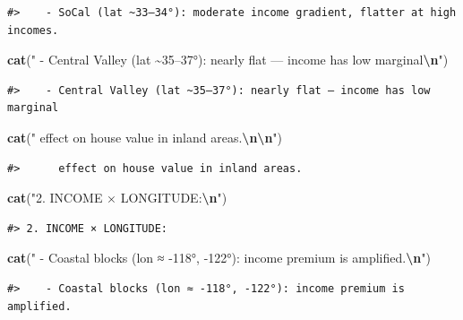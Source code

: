 \documentclass[
]{article}
\newenvironment{Shaded}{\begin{snugshade}}{\end{snugshade}}
\newcommand{\FunctionTok}[1]{\textcolor[rgb]{0.13,0.29,0.53}{\textbf{#1}}}
\newcommand{\NormalTok}[1]{#1}
\newcommand{\SpecialCharTok}[1]{\textcolor[rgb]{0.81,0.36,0.00}{\textbf{#1}}}
\newcommand{\StringTok}[1]{\textcolor[rgb]{0.31,0.60,0.02}{#1}}
\begin{document}
\begin{verbatim}
#>    - SoCal (lat ~33–34°): moderate income gradient, flatter at high incomes.
\end{verbatim}

\begin{Shaded}
\begin{Highlighting}[]
\FunctionTok{cat}\NormalTok{(}\StringTok{"   {-} Central Valley (lat \textasciitilde{}35–37°): nearly flat — income has low marginal}\SpecialCharTok{\textbackslash{}n}\StringTok{"}\NormalTok{)}
\end{Highlighting}
\end{Shaded}

\begin{verbatim}
#>    - Central Valley (lat ~35–37°): nearly flat — income has low marginal
\end{verbatim}

\begin{Shaded}
\begin{Highlighting}[]
\FunctionTok{cat}\NormalTok{(}\StringTok{"     effect on house value in inland areas.}\SpecialCharTok{\textbackslash{}n\textbackslash{}n}\StringTok{"}\NormalTok{)}
\end{Highlighting}
\end{Shaded}

\begin{verbatim}
#>      effect on house value in inland areas.
\end{verbatim}

\begin{Shaded}
\begin{Highlighting}[]
\FunctionTok{cat}\NormalTok{(}\StringTok{"2. INCOME × LONGITUDE:}\SpecialCharTok{\textbackslash{}n}\StringTok{"}\NormalTok{)}
\end{Highlighting}
\end{Shaded}

\begin{verbatim}
#> 2. INCOME × LONGITUDE:
\end{verbatim}

\begin{Shaded}
\begin{Highlighting}[]
\FunctionTok{cat}\NormalTok{(}\StringTok{"   {-} Coastal blocks (lon ≈ {-}118°, {-}122°): income premium is amplified.}\SpecialCharTok{\textbackslash{}n}\StringTok{"}\NormalTok{)}
\end{Highlighting}
\end{Shaded}

\begin{verbatim}
#>    - Coastal blocks (lon ≈ -118°, -122°): income premium is amplified.
\end{verbatim}
\end{document}
